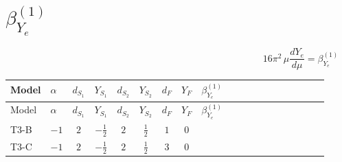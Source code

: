 \documentclass{article}
\begin{document}
\begin{landscape}
\begin{longtable}{@{}llcccccc >{\raggedright\arraybackslash}p{0.54\linewidth}@{}}
\midrule
\bottomrule
\end{longtable}
\clearpage
\section*{$\beta_{Y_e}^{(1)}$}
\[16\pi^2\,\mu\frac{d Y_e}{d\mu}=\beta_{Y_e}^{(1)}\]
\tiny
\begin{longtable}{@{}llcccccc >{\raggedright\arraybackslash}p{0.54\linewidth}@{}}
\toprule
Model & $\alpha$ & $d_{S_1}$ & $Y_{S_1}$ & $d_{S_2}$ & $Y_{S_2}$ & $d_F$ & $Y_F$ & $\beta_{Y_e}^{(1)}$ \\
\midrule
\endfirsthead
\toprule
Model & $\alpha$ & $d_{S_1}$ & $Y_{S_1}$ & $d_{S_2}$ & $Y_{S_2}$ & $d_F$ & $Y_F$ & $\beta_{Y_e}^{(1)}$ \\
\midrule
\endhead
T3-B & $-1$ & $2$ & $-\frac{1}{2}$ & $2$ & $\frac{1}{2}$ & $1$ & $0$ & \scriptsize\adjustbox{max width=\linewidth}{$\begin{gathered} 3 \operatorname{Tr}\!\left({Y_d}\,\left({Y_d}\right)^{\dagger}\right) \left({Y_e}\right)_{ij} \\ +3 \operatorname{Tr}\!\left({Y_u}\,\left({Y_u}\right)^{\dagger}\right) \left({Y_e}\right)_{ij} \\ +\operatorname{Tr}\!\left({Y_e}\,\left({Y_e}\right)^{\dagger}\right) \left({Y_e}\right)_{ij} \\ +\frac{1}{2} (\left({y_1}\,\left({y_1}\right)^{\dagger}\,{Y_e}\right)_{ij}+\left({y_2}\,\left({y_2}\right)^{\dagger}\,{Y_e}\right)_{ij}+3 \left({Y_e}\,\left({Y_e}\right)^{\dagger}\,{Y_e}\right)_{ij}) \\ -\frac{9}{4} {g_2}^2 \left({Y_e}\right)_{ij} \\ -\frac{15}{4} {g_Y}^2 \left({Y_e}\right)_{ij}\end{gathered}$} \\
\midrule
T3-C & $-1$ & $2$ & $-\frac{1}{2}$ & $2$ & $\frac{1}{2}$ & $3$ & $0$ & \scriptsize\adjustbox{max width=\linewidth}{$\begin{gathered} 3 \operatorname{Tr}\!\left({Y_d}\,\left({Y_d}\right)^{\dagger}\right) \left({Y_e}\right)_{ij} \\ +3 \operatorname{Tr}\!\left({Y_u}\,\left({Y_u}\right)^{\dagger}\right) \left({Y_e}\right)_{ij} \\ +\operatorname{Tr}\!\left({Y_e}\,\left({Y_e}\right)^{\dagger}\right) \left({Y_e}\right)_{ij} \\ +\frac{3}{4} (\left({y_1}\,\left({y_1}\right)^{\dagger}\,{Y_e}\right)_{ij}+\left({y_2}\,\left({y_2}\right)^{\dagger}\,{Y_e}\right)_{ij}+2 \left({Y_e}\,\left({Y_e}\right)^{\dagger}\,{Y_e}\right)_{ij}) \\ -\frac{9}{4} {g_2}^2 \left({Y_e}\right)_{ij} \\ -\frac{15}{4} {g_Y}^2 \left({Y_e}\right)_{ij}\end{gathered}$} \\

\end{longtable}
\end{landscape}
\end{document}
